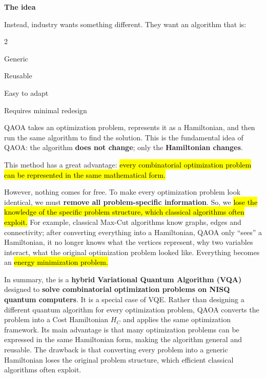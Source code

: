 \highspace
\begin{flushleft}
    \textcolor{Green3}{ \textbf{The idea}}
\end{flushleft}
Instead, industry wants something different. They want an algorithm that is:
\begin{itemize}
    \begin{multicols}{2}
        \item Generic
        \item Reusable
        \item Easy to adapt
        \item Requires minimal redesign
    \end{multicols}
\end{itemize}
QAOA takes an optimization problem, represents it as a Hamiltonian, and then run the same algorithm to find the solution. This is the fundamental idea of QAOA: the algorithm \textbf{does not change}; only the \textbf{Hamiltonian changes}.

\highspace
\textcolor{Green3}{} This method has a great advantage: \hl{every combinatorial optimization problem can be represented in the same mathematical form.}

\highspace
\textcolor{Red2}{} However, nothing comes for free. To make every optimization problem look identical, we must \textbf{remove all problem-specific information}. So, we \hl{lose the knowledge of the specific problem structure, which classical algorithms often exploit.} For example, classical Max-Cut algorithms know graphs, edges and connectivity; after converting everything into a Hamiltonian, QAOA only ``sees'' a Hamiltonian, it no longer knows what the vertices represent, why two variables interact, what the original optimization problem looked like. Everything becomes an \hl{energy minimization problem.}

\highspace
In summary, the  is a \textbf{hybrid Variational Quantum Algorithm (VQA)} designed to \textbf{solve combinatorial optimization problems on NISQ quantum computers}. It is a special case of VQE. Rather than designing a different quantum algorithm for every optimization problem, QAOA converts the problem into a Cost Hamiltonian $H_C$ and applies the same optimization framework. Its main advantage is that many optimization problems can be expressed in the same Hamiltonian form, making the algorithm general and reusable. The drawback is that converting every problem into a generic Hamiltonian loses the original problem structure, which efficient classical algorithms often exploit.